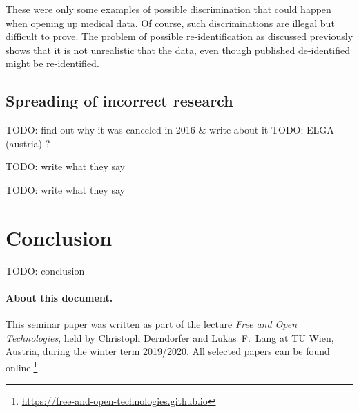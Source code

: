 \documentclass[a4paper, 11pt]{article}
\begin{document}
These were only some examples of possible discrimination that could happen when opening up medical data. Of course, such discriminations are illegal but difficult to prove. 
The problem of possible re-identification as discussed previously shows that it is not unrealistic that the data, even though published de-identified might be re-identified. \cite{Hoffman2015}


\subsection{Spreading of incorrect research}
\cite{Hoffman2015}


TODO: find out why it was canceled in 2016 & write about it
TODO: ELGA (austria) ?


TODO: write what they say
\cite{Vayena_et_al2015} 

TODO: write what they say
\cite{Fairchild631}

\section{Conclusion}\label{sec:conclusion}
TODO: conclusion







\paragraph{About this document.} This seminar paper was written as part of the lecture \emph{Free and Open Technologies}, held by Christoph Derndorfer and Lukas~F.\ Lang at TU Wien, Austria, during the winter term 2019/2020.
All selected papers can be found online.\footnote{\url{https://free-and-open-technologies.github.io}}

\doclicenseThis
\end{document}
